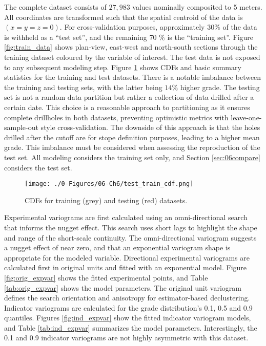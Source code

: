 The complete dataset consists of $27,983$ values nominally composited to 5 meters. All coordinates are transformed such that the spatial centroid of the data is $(x=y=z=0)$. For cross-validation purposes, approximately 30\% of the data is withheld as a ``test set'', and the remaining 70 \% is the ``training set''. Figure \ref{fig:train_data} shows plan-view, east-west and north-south sections through the training dataset coloured by the variable of interest. The test data is not exposed to any subsequent modeling step. Figure \ref{fig:datasets} shows \glspl{CDF} and basic summary statistics for the training and test datasets. There is a notable imbalance between the training and testing sets, with the latter being $14\%$ higher grade. The testing set is not a random data partition but rather a collection of data drilled after a certain date. This choice is a reasonable approach to partitioning as it ensures complete drillholes in both datasets, preventing optimistic metrics with leave-one-sample-out style cross-validation. The downside of this approach is that the holes drilled after the cutoff are for stope definition purposes, leading to a higher mean grade. This imbalance must be considered when assessing the reproduction of the test set. All modeling considers the training set only, and Section \ref{sec:06compare} considers the test set.

\begin{figure}[htb!]
    \centering
    \texttt{[image: ./0-Figures/06-Ch6/test\_train\_cdf.png]}
    \caption{ \Glspl{CDF} for training (grey) and testing (red) datasets. }
    \label{fig:datasets}
\end{figure}

Experimental variograms are first calculated using an omni-directional search that informs the nugget effect. This search uses short lags to highlight the shape and range of the short-scale continuity. The omni-directional variogram suggests a nugget effect of near zero, and that an exponential variogram shape is appropriate for the modeled variable. Directional experimental variograms are calculated first in original units and fitted with an exponential model. Figure \ref{fig:orig_expvar} shows the fitted experimental points, and Table \ref{tab:orig_expvar} shows the model parameters. The original unit variogram defines the search orientation and anisotropy for estimator-based declustering. Indicator variograms are calculated for the grade distribution's 0.1, 0.5 and 0.9 quantiles. Figures \ref{fig:ind_expvar} show the fitted indicator variogram models, and Table \ref{tab:ind_expvar} summarizes the model parameters. Interestingly, the 0.1 and 0.9 indicator variograms are not highly asymmetric with this dataset.

